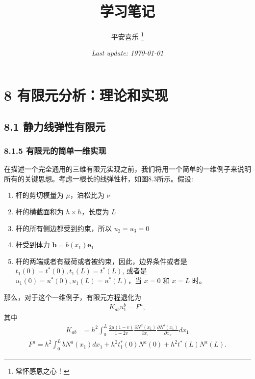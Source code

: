 \documentclass[12pt,a4paper]{book}
\title{\LARGE\bfseries\songti 学习笔记}
\author{ \kaishu 平安喜乐
		\thanks{常怀感恩之心！} \\[0.5ex] %
		}
\date{\small\itshape Last update: \today}
\begin{document}
\songti

\maketitle 
\clearpage

\tableofcontents  
\clearpage




\clearpage
\chapter*{8 有限元分析：理论和实现}

\section*{8.1 静力线弹性有限元}


\subsection*{8.1.5 有限元的简单一维实现}


在描述一个完全通用的三维有限元实现之前，我们将用一个简单的一维例子来说明所有的关键思想。考虑一根长的线弹性杆，如图8.3所示。假设:

\begin{enumerate}
    \item 杆的剪切模量为 $\mu$，泊松比为 $\nu$
    \item 杆的横截面积为 $h\times h$，长度为 $L$
    \item 杆的所有侧边都受到约束，所以 $u_2=u_3=0$
    \item 杆受到体力 $\bm{b} = b(x_1) \bm{e}_1$
    \item 杆的两端或者有载荷或者被约束，因此，边界条件或者是 $t_1(0) = t^*(0), t_1(L) = t^*(L)$, 或者是 $u_1(0) = u^*(0), u_1(L) = u^*(L)$，当 $x=0$ 和 $x=L$ 时。
\end{enumerate}

那么，对于这个一维例子，有限元方程退化为
\begin{equation*}
    \begin{aligned}
        K_{ab} u_1^b = F^a,
    \end{aligned}
\end{equation*}
其中
\begin{equation*}
    \begin{aligned}
        K_{a b} & = h^{2} \int_{0}^{L} \frac{2 \mu(1-v)}{1-2 v} \frac{\partial N^{a}\left(x_{1}\right)}{\partial x_{1}} \frac{\partial N^{b}\left(x_{1}\right)}{\partial x_{1}} d x_{1}
    \end{aligned}
\end{equation*}
%
\begin{equation*}
    \begin{aligned}
        F^{a}=h^{2} \int_{0}^{L} b N^{a}\left(x_{1}\right) d x_{1}+h^{2} t_{1}^{*}(0) N^{a}(0)+h^{2} t^{*}(L) N^{a}(L) .
    \end{aligned}
\end{equation*}
\end{document}
